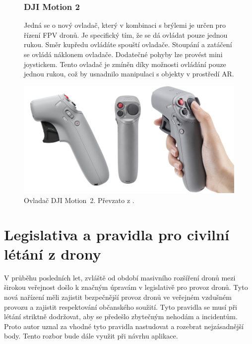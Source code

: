 \begin{figure}[h]
  \begin{minipage}{0.6\textwidth}
  \subsubsection{DJI Motion 2 }
    Jedná se o nový ovladač, který v kombinaci s brýlemi je určen pro řízení FPV dronů. Je specifický tím, že se dá ovládat pouze jednou rukou. Směr kupředu ovládáte spouští ovladače. Stoupání a zatáčení se ovládá náklonem ovladače. Dodatečné pohyby lze provést mini joystickem. Tento ovladač je zmíněn díky možnosti ovládání pouze jednou rukou, což by usnadnilo manipulaci s objekty v prostředí AR. 
  \end{minipage}%
  \hfill
  \begin{minipage}{0.38\textwidth}
    \centering
    \includegraphics[width=\textwidth]{obrazky-figures/drony/djiMotion.png}
    \captionsetup{type=figure} %
    \caption{Ovladač DJI Motion~2. Převzato z \cite{djiMotionPic}.}
    \label{fig:DjiMotion}
  \end{minipage}
\end{figure}
\newpage
\section{Legislativa a pravidla pro civilní létání z drony}
V průběhu posledních let, zvláště od období masivního rozšíření dronů mezi širokou veřejnost došlo k značným úpravám v legislativě pro provoz dronů. Tyto nová nařízení měli zajistit bezpečnější provoz dronů ve veřejném vzdušném provozu a zajistit respektování občanského soužití. Tyto pravidla se musí při létání striktně dodržovat, aby se předešlo zbytečným nehodám a incidentům. Proto autor uznal za vhodné tyto pravidla nastudovat a rozebrat nejzásadnější body. Tento rozbor bude dále využit při návrhu aplikace.

